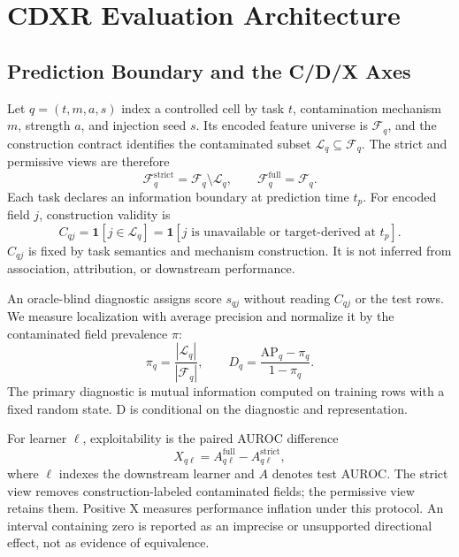 \documentclass[sigconf,review]{acmart}
\begin{document}
\section{CDXR Evaluation Architecture}

\subsection{Prediction Boundary and the C/D/X Axes}

Let $q=(t,m,a,s)$ index a controlled cell by task $t$, contamination
mechanism $m$, strength $a$, and injection seed $s$. Its encoded feature
universe is $\mathcal{F}_q$, and the construction contract identifies the
contaminated subset $\mathcal{L}_q\subseteq\mathcal{F}_q$. The strict and
permissive views are therefore
\begin{equation}
 \mathcal{F}^{\mathrm{strict}}_q=\mathcal{F}_q\setminus\mathcal{L}_q,
 \qquad
 \mathcal{F}^{\mathrm{full}}_q=\mathcal{F}_q.
 \label{eq:feature-views}
\end{equation}
Each task declares an information boundary at prediction time $t_p$. For
encoded field $j$, construction validity is
\begin{equation}
  C_{qj}=\mathbf{1}\!\left[j\in\mathcal{L}_q\right]
  =\mathbf{1}\!\left[j\text{ is unavailable or target-derived at }t_p\right].
  \label{eq:construction-validity}
\end{equation}
$C_{qj}$ is fixed by task semantics and mechanism construction. It is not inferred
from association, attribution, or downstream performance.

An oracle-blind diagnostic assigns score $s_{qj}$ without reading $C_{qj}$ or the
test rows. We measure localization with average precision and normalize it by
the contaminated field prevalence $\pi$:
\begin{equation}
  \pi_q=\frac{|\mathcal{L}_q|}{|\mathcal{F}_q|},
  \qquad
  D_q = \frac{\mathrm{AP}_q-\pi_q}{1-\pi_q}.
  \label{eq:detectability}
\end{equation}
The primary diagnostic is mutual information computed on training rows with a
fixed random state. D is conditional on the diagnostic and representation.

For learner $\ell$, exploitability is the paired AUROC difference
\begin{equation}
  X_{q\ell} = A^{\mathrm{full}}_{q\ell}
      - A^{\mathrm{strict}}_{q\ell},
  \label{eq:exploitability}
\end{equation}
where $\ell$ indexes the downstream learner and $A$ denotes test AUROC.
The strict view removes construction-labeled contaminated fields; the
permissive view retains them. Positive X measures performance inflation under
this protocol. An interval containing zero is reported as an imprecise or
unsupported directional effect, not as evidence of equivalence.
\end{document}
